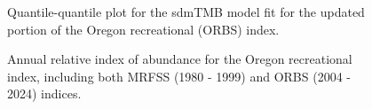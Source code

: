 \documentclass[
]{scrartcl}
\begin{document}
\begin{figure}


\caption{\label{fig-orbs_qq}Quantile-quantile plot for the sdmTMB model
fit for the updated portion of the Oregon recreational (ORBS) index.}

\end{figure}%

\begin{figure}


\caption{\label{fig-ORBS_index}Annual relative index of abundance for
the Oregon recreational index, including both MRFSS (1980 - 1999) and
ORBS (2004 - 2024) indices.}

\end{figure}%
\end{document}
